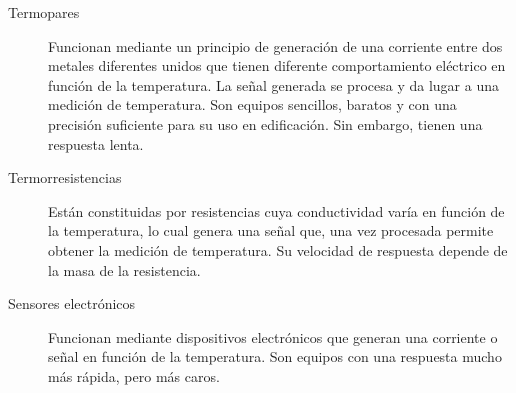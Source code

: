 \begin{description}
\item[Termopares] Funcionan mediante un principio de generación de una corriente entre dos metales diferentes unidos que tienen diferente comportamiento eléctrico en función de la temperatura. La señal generada se procesa y da lugar a una medición de temperatura. Son equipos sencillos, baratos y con una precisión suficiente para su uso en edificación. Sin embargo, tienen una respuesta lenta.
\item[Termorresistencias] Están constituidas por resistencias cuya conductividad varía en función de la temperatura, lo cual genera una señal que, una vez procesada permite obtener la medición de temperatura. Su velocidad de respuesta depende de la masa de la resistencia.
\item[Sensores electrónicos] Funcionan mediante dispositivos electrónicos que generan una corriente o señal en función de la temperatura. Son equipos con una respuesta mucho más rápida, pero más caros.
\end{description}

